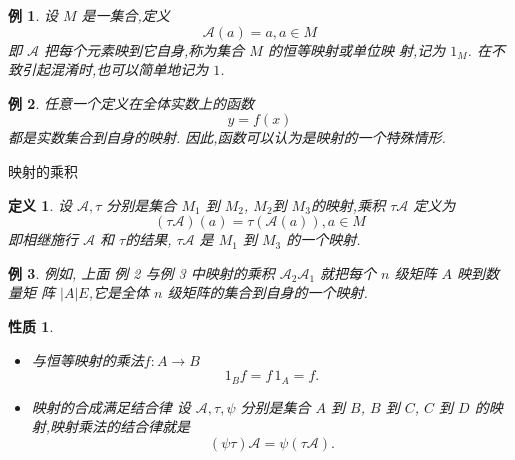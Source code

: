 \documentclass[13pt]{beamer}
\newtheorem{exa}{例}
\newtheorem*{defi}{定义}
\newtheorem*{prop}{性质}
\def\A{\mathscr{A}}
\begin{document}
\begin{frame}
\begin{exa}
设 $M$ 是一集合,定义
\[
\A(a)=a, a \in M
\]
即 $\A$ 把每个元素映到它自身,称为集合 $M$ 的恒等映射或单位映 射,记为  $1_{M}$. 在不致引起混淆时,也可以简单地记为 $1$.
\end{exa}

\begin{exa}
任意一个定义在全体实数上的函数
\[
y=f(x)
\]
都是实数集合到自身的映射.
因此,函数可以认为是映射的一个特殊情形.
\end{exa}
\end{frame}

\begin{frame}{映射的乘积}
\begin{defi}
设 $\A, \tau$ 分别是集合 $M_1$ 到 $M_2$, $M_2$到 $M_3$的映射,乘积 $\tau \A$ 定义为
\[
(\tau \A)(a)=\tau(\A(a)), a \in M
\]
即相继施行 $\A$ 和 $\tau$的结果, $\tau \A$  是 $M_1$ 到 $M_3$ 的一个映射. 	
\end{defi}


\begin{exa}
例如, 上面 例 2 与例 3 中映射的乘积 $\A_{2} \A_{1}$ 就把每个 $n$ 级矩阵 ${A}$ 映到数量矩 阵 $|A|{E}$,它是全体 $n$ 级矩阵的集合到自身的一个映射.	
\end{exa}



\end{frame}

\begin{frame}
\begin{prop}
\begin{itemize}
\item 与恒等映射的乘法\quad  $f: A \rightarrow B$
\[
{1}_{B} {f}={f}\, {1}_{A}={f}.
\]
\item 映射的合成满足结合律 \quad
设 $\A, \tau, \psi$ 分别是集合 $A$ 到 $B$, $B$
到 $C$, $C$ 到 $D$ 的映射,映射乘法的结合律就是
\[
(\psi \tau) \A=\psi(\tau \A).
\]
\end{itemize}
\end{prop}
\end{frame}
\end{document}
